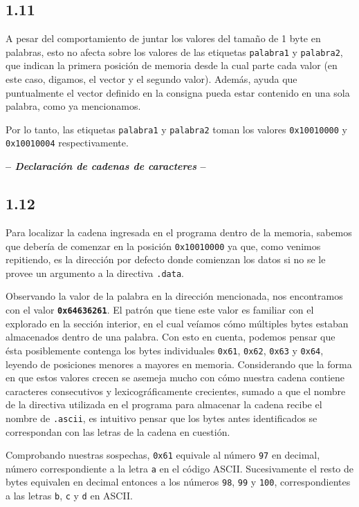 \documentclass[a4paper]{report}
\begin{document}
\subsection*{1.11}

A pesar del comportamiento de juntar los valores del tamaño de 1 byte en palabras, esto no afecta sobre los valores de las etiquetas \texttt{palabra1} y \texttt{palabra2}, que indican la primera posición de memoria desde la cual parte cada valor (en este caso, digamos, el vector y el segundo valor). Además, ayuda que puntualmente el vector definido en la consigna pueda estar contenido en una sola palabra, como ya mencionamos.

Por lo tanto, las etiquetas \texttt{palabra1} y \texttt{palabra2} toman los valores \texttt{0x10010000} y \texttt{0x10010004} respectivamente.

\begin{center}
\large\textbf{-- \textsl{Declaración de cadenas de caracteres} --}
\end{center}

\subsection*{1.12}

Para localizar la cadena ingresada en el programa dentro de la memoria, sabemos que debería de comenzar en la posición \texttt{0x10010000} ya que, como venimos repitiendo, es la dirección por defecto donde comienzan los datos si no se le provee un argumento a la directiva \texttt{.data}.

Observando la valor de la palabra en la dirección mencionada, nos encontramos con el valor \textbf{\texttt{0x64636261}}. El patrón que tiene este valor es familiar con el explorado en la sección interior, en el cual veíamos cómo múltiples bytes estaban almacenados dentro de una palabra. Con esto en cuenta, podemos pensar que ésta posiblemente contenga los bytes individuales \texttt{0x61}, \texttt{0x62}, \texttt{0x63} y \texttt{0x64}, leyendo de posiciones menores a mayores en memoria. Considerando que la forma en que estos valores crecen se asemeja mucho con cómo nuestra cadena contiene caracteres consecutivos y lexicográficamente crecientes, sumado a que el nombre de la directiva utilizada en el programa para almacenar la cadena recibe el nombre de \texttt{.ascii}, es intuitivo pensar que los bytes antes identificados se correspondan con las letras de la cadena en cuestión.

Comprobando nuestras sospechas, \texttt{0x61} equivale al número \texttt{97} en decimal, número correspondiente a la letra \texttt{\textquotesingle{}a\textquotesingle{}} en el código ASCII. Sucesivamente el resto de bytes equivalen en decimal entonces a los números \texttt{98}, \texttt{99} y \texttt{100}, correspondientes a las letras \texttt{\textquotesingle{}b\textquotesingle{}}, \texttt{\textquotesingle{}c\textquotesingle{}} y \texttt{\textquotesingle{}d\textquotesingle{}} en ASCII.
\end{document}
